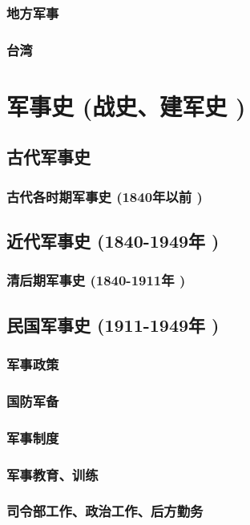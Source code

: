 \documentclass[UTF8]{../ApplicationUniverse}
\begin{document}
    \subsubsection{地方军事}
    \subsubsection{台湾}

\section{军事史 (战史、建军史 )}
    \subsection{古代军事史}
        \subsubsection{古代各时期军事史 (1840年以前 )}
    \subsection{近代军事史 (1840-1949年 )}
        \subsubsection{清后期军事史 (1840-1911年 )}
    \subsection{民国军事史 (1911-1949年 )}
        \subsubsection{军事政策}
        \subsubsection{国防军备}
        \subsubsection{军事制度}
        \subsubsection{军事教育、训练}
        \subsubsection{司令部工作、政治工作、后方勤务}
\end{document}
